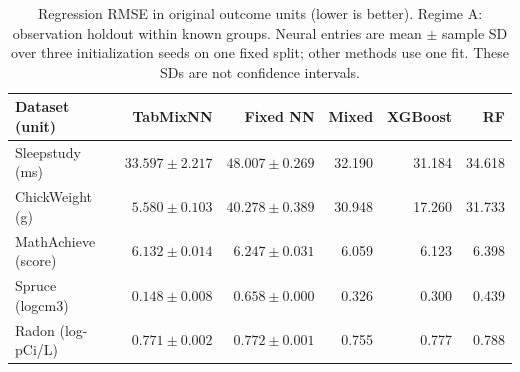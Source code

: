 \begin{table}[htbp]
\centering
\small
\caption{Regression RMSE in original outcome units (lower is better). Regime A: observation holdout within known groups. Neural entries are mean $\pm$ sample SD over three initialization seeds on one fixed split; other methods use one fit. These SDs are not confidence intervals.}
\label{tab:regression_A}
\begin{tabular}{lrrrrr}
\toprule
Dataset (unit) & TabMixNN & Fixed NN & Mixed & XGBoost & RF \\
\midrule
Sleepstudy (ms) & $33.597 \pm 2.217$ & $48.007 \pm 0.269$ & 32.190 & 31.184 & 34.618 \\
ChickWeight (g) & $5.580 \pm 0.103$ & $40.278 \pm 0.389$ & 30.948 & 17.260 & 31.733 \\
MathAchieve (score) & $6.132 \pm 0.014$ & $6.247 \pm 0.031$ & 6.059 & 6.123 & 6.398 \\
Spruce (logcm3) & $0.148 \pm 0.008$ & $0.658 \pm 0.000$ & 0.326 & 0.300 & 0.439 \\
Radon (log-pCi/L) & $0.771 \pm 0.002$ & $0.772 \pm 0.001$ & 0.755 & 0.777 & 0.788 \\
\bottomrule
\end{tabular}
\end{table}
